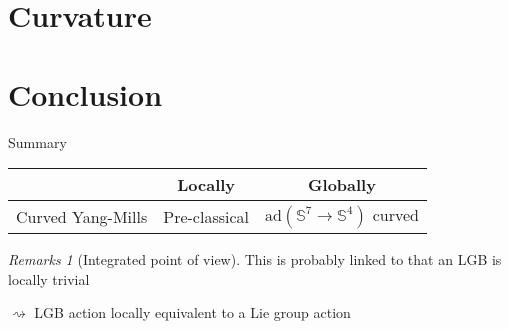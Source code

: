 \documentclass[hyperref={pdfpagelabels=false}]{beamer}
\theoremstyle{plain}
\theoremstyle{remark}
\newtheorem*{remark}{Remarks}
\begin{document}
\section{Curvature}
{
\begin{frame}

\end{frame}
}

\section{Conclusion}
{
\begin{frame}{Summary}
\begin{table}[h!]
		\begin{tabularx}{\textwidth}{X| c c} 
			\rowcolor{gray}
			& Locally & Globally \\ \hline
			Curved Yang-Mills & Pre-classical & $\mathrm{ad}(\mathds{S}^7 \to \mathds{S}^4)$ curved 
		\end{tabularx}
\end{table}
\begin{remark}[Integrated point of view]
This is probably linked to that an LGB is locally trivial 

$\rightsquigarrow$ LGB action locally equivalent to a Lie group action
\end{remark}

\end{frame}

}
\end{document}
